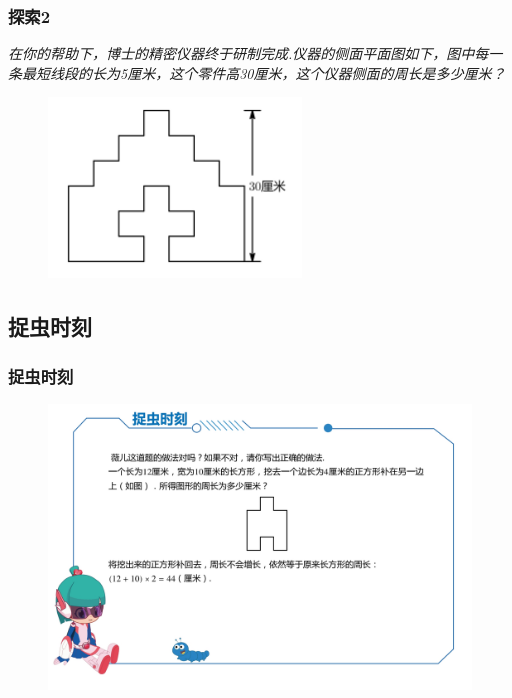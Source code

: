 \begin{frame}
    \frametitle{探索2}
    \textit{在你的帮助下，博士的精密仪器终于研制完成.仪器的侧面平面图如下，图中每一条最短线段的长为5厘米，这个零件高30厘米，这个仪器侧面的周长是多少厘米？}
    \begin{figure}[H] 
        \centering
        \includegraphics[width=0.6\textwidth]{./pics/Chapter_1/tansuo2_2.png}
    \end{figure}
\end{frame}

\subsection{捉虫时刻}
\begin{frame}
    \frametitle{捉虫时刻}
    \begin{figure}[H] 
        \centering
        \includegraphics[width=1\textwidth]{./pics/Chapter_1/zhuochong1.png}
    \end{figure}
\end{frame}

